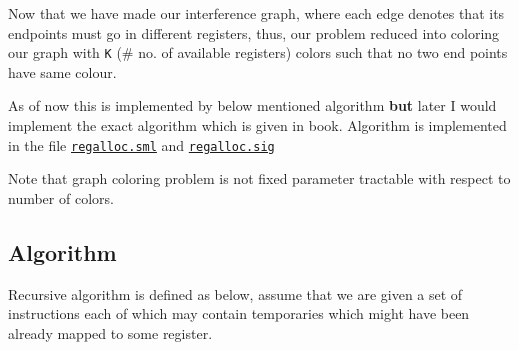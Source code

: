 Now that we have made our interference graph, where each edge denotes
that its endpoints must go in different registers, thus, our problem
reduced into coloring our graph with
\texttt{K} (\#
no. of available registers) colors such that no two end points have same
colour.

As of now this is implemented by below mentioned algorithm \textbf{but}
later I would implement the exact algorithm which is given in book.
Algorithm is implemented in the file
\href{https://www.github.com/sourabh2311/btp/tree/master/Compiler/regalloc.sml}{\texttt{regalloc.sml}}
and
\href{https://www.github.com/sourabh2311/btp/tree/master/Compiler/regalloc.sig}{\texttt{regalloc.sig}}

Note that graph coloring problem is not fixed parameter tractable with
respect to number of colors.

\hypertarget{algorithm}{%
\subsection{Algorithm}\label{algorithm}}

Recursive algorithm is defined as below, assume that we are given a set
of instructions each of which may contain temporaries which might have
been already mapped to some register.

